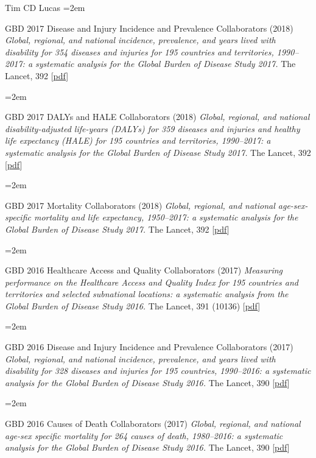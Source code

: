 \documentclass{scrartcl}
\newcommand{\MarginText}[1]{\marginpar{\raggedleft\itshape\small#1}} %
\newcommand{\Description}[1]{\hangindent=2em\hangafter=0\noindent\raggedright\footnotesize{#1}\par\normalsize\vspace{1em}} %
\begin{document}
\begin{cv}{Tim {\Large CD} Lucas}
\Description{GBD 2017 Disease and Injury Incidence and Prevalence Collaborators (2018) \emph{Global, regional, and national incidence, prevalence, and years lived with disability for 354 diseases and injuries for 195 countries and territories, 1990--2017: a systematic analysis for the Global Burden of Disease Study 2017.} The Lancet, 392 [\href{https://www.sciencedirect.com/science/article/pii/S0140673618322797/pdfft?md5=7f77aa9068dc470c4dec82747c586883&pid=1-s2.0-S0140673618322797-main.pdf}{pdf}]}


\Description{GBD 2017 DALYs and HALE Collaborators (2018) \emph{Global, regional, and national disability-adjusted life-years (DALYs) for 359 diseases and injuries and healthy life expectancy (HALE) for 195 countries and territories, 1990--2017: a systematic analysis for the Global Burden of Disease Study 2017.} The Lancet, 392 [\href{https://www.sciencedirect.com/science/article/pii/S0140673618318919/pdfft?md5=e63230d66805f99e38a7dc60873c7bf0&pid=1-s2.0-S0140673618318919-main.pdf}{pdf}]}

\Description{GBD 2017 Mortality Collaborators (2018) \emph{Global, regional, and national age-sex-specific mortality and life expectancy, 1950--2017: a systematic analysis for the Global Burden of Disease Study 2017.} The Lancet, 392 [\href{https://www.sciencedirect.com/science/article/pii/S0140673618323353/pdfft?md5=06fd82a2bba62e2be2849270cc28fe17&pid=1-s2.0-S0140673618323353-main.pdf}{pdf}]}

\Description{GBD 2016 Healthcare Access and Quality Collaborators (2017) \emph{Measuring performance on the Healthcare Access and Quality Index for 195 countries and territories and selected subnational locations: a systematic analysis from the Global Burden of Disease Study 2016.} The Lancet, 391 (10136) [\href{https://www.thelancet.com/action/showPdf?pii=S0140-6736\%2817\%2932336-X}{pdf}]}



\Description{\MarginText{2017}GBD 2016 Disease and Injury Incidence and Prevalence Collaborators (2017) \emph{Global, regional, and national incidence, prevalence, and years lived with disability for 328 diseases and injuries for 195 countries, 1990--2016: a systematic analysis for the Global Burden of Disease Study 2016.} The Lancet, 390 [\href{https://www.thelancet.com/action/showPdf?pii=S0140-6736\%2817\%2932154-2}{pdf}]}

\Description{GBD 2016 Causes of Death Collaborators (2017) \emph{Global, regional, and national age-sex specific mortality for 264 causes of death, 1980--2016: a systematic analysis for the Global Burden of Disease Study 2016.} The Lancet, 390 [\href{https://www.thelancet.com/action/showPdf?pii=S0140-6736\%2817\%2932152-9}{pdf}]}


\end{cv}
\end{document}
